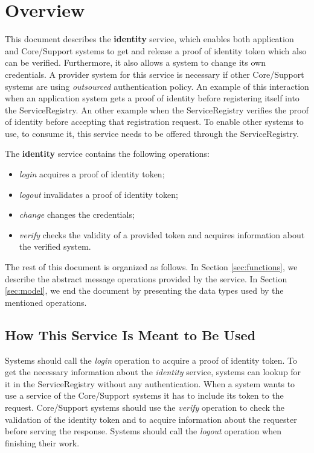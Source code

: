 \documentclass[a4paper]{arrowhead}
\begin{document}
\section{Overview}
\label{sec:overview}
This document describes the \textbf{identity} service, which enables both application and Core/Support systems to get and release a proof of identity token which also can be verified. Furthermore, it also allows a system to change its own credentials. A provider system for this service is necessary if other Core/Support systems are using \textit{outsourced} authentication policy. An example of this interaction when an application system gets a proof of identity before registering itself into the ServiceRegistry. An other example when the ServiceRegistry verifies the proof of identity before accepting that registration request. To enable other systems to use, to consume it, this service needs to be offered through the ServiceRegistry.

The \textbf{identity} service contains the following operations:

\begin{itemize}
    \item \textit{login} acquires a proof of identity token;
    \item \textit{logout} invalidates a proof of identity token;
    \item \textit{change} changes the credentials;
    \item \textit{verify} checks the validity of a provided token and acquires information about the verified system.
\end{itemize}

The rest of this document is organized as follows.
In Section \ref{sec:functions}, we describe the abstract message operations provided by the service.
In Section \ref{sec:model}, we end the document by presenting the data types used by the mentioned operations.

\subsection{How This Service Is Meant to Be Used}
Systems should call the \textit{login} operation to acquire a proof of identity token. To get the necessary information about the \textit{identity} service, systems can lookup for it in the ServiceRegistry without any authentication. When a system wants to use a service of the Core/Support systems it has to include its token to the request. Core/Support systems should use the \textit{verify} operation to check the validation of the identity token and to acquire information about the requester before serving the response. Systems should call the \textit{logout} operation when finishing their work.
\end{document}
